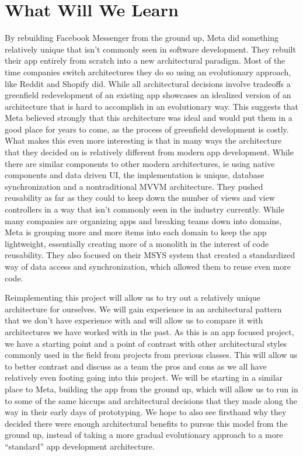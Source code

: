 \documentclass[12pt]{article}
\begin{document}

    \section{What Will We Learn}
    By rebuilding Facebook Messenger from the ground up, Meta did something relatively unique that isn’t commonly seen in software development.
    They rebuilt their app entirely from scratch into a new architectural paradigm.
    Most of the time companies switch architectures they do so using an evolutionary approach, like Reddit and Shopify did.
    While all architectural decisions involve tradeoffs a greenfield redevelopment of an existing app showcases an idealized version of an architecture that is hard to accomplish in an evolutionary way.
    This suggests that Meta believed strongly that this architecture was ideal and would put them in a good place for years to come, as the process of greenfield development is costly.
    What makes this even more interesting is that in many ways the architecture that they decided on is relatively different from modern app development.
    While there are similar components to other modern architectures, ie using native components and data driven UI, the implementation is unique, database synchronization and a nontraditional MVVM architecture.
    They pushed reusability as far as they could to keep down the number of views and view controllers in a way that isn’t commonly seen in the industry currently.
    While many companies are organizing apps and breaking teams down into domains, Meta is grouping more and more items into each domain to keep the app lightweight, essentially creating more of a monolith in the interest of code reusability.
    They also focused on their MSYS system that created a standardized way of data access and synchronization, which allowed them to reuse even more code.

    Reimplementing this project will allow us to try out a relatively unique architecture for ourselves.
    We will gain experience in an architectural pattern that we don’t have experience with and will allow us to compare it with architectures we have worked with in the past.
    As this is an app focused project, we have a starting point and a point of contrast with other architectural styles commonly used in the field from projects from previous classes.
    This will allow us to better contrast and discuss as a team the pros and cons as we all have relatively even footing going into this project.
    We will be starting in a similar place to Meta, building the app from the ground up, which will allow us to run in to some of the same hiccups and architectural decisions that they made along the way in their early days of prototyping.
    We hope to also see firsthand why they decided there were enough architectural benefits to pursue this model from the ground up, instead of taking a more gradual evolutionary approach to a more “standard” app development architecture.

\end{document}
